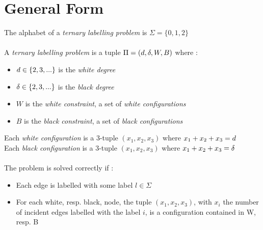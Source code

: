 \section{General Form}
The alphabet of a \textit{ternary labelling problem} is $\Sigma = \{0,1,2\}$\\\\
A \textit{ternary labelling problem} is a tuple $\Pi = (d,\delta,W,B)$ where :
\begin{itemize}
    \item $d\in\{2,3,...\}$ is the \textit{white degree}
    \item $\delta\in\{2,3,...\}$ is the \textit{black degree}
    \item $W$ is the \textit{white constraint}, a set of \textit{white configurations}
    \item $B$ is the \textit{black constraint}, a set of \textit{black configurations}
\end{itemize}
Each \textit{white configuration} is a 3-tuple $(x_1,x_2,x_3)$ where $x_1+x_2+x_3 = d$\\
Each \textit{black configuration} is a 3-tuple $(x_1,x_2,x_3)$ where $x_1+x_2+x_3 = \delta$\\\\
The problem is solved correctly if :
\begin{itemize}
    \item Each edge is labelled with some label $l\in\Sigma$
    \item For each white, resp. black, node, the tuple $(x_1,x_2, x_3)$, with $x_i$ the number of incident edges labelled with the label $i$, is a configuration contained in W, resp. B
\end{itemize}

